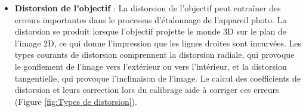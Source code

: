   \begin{itemize}
  	\item \textbf{Distorsion de l’objectif } :  La distorsion de l’objectif peut entraîner des erreurs importantes dans le processus d’étalonnage de l’appareil photo. La distorsion se produit lorsque l’objectif projette le monde 3D sur le plan de l’image 2D, ce qui donne l’impression que les lignes droites sont incurvées. Les types courants de distorsion comprennent la distorsion radiale, qui provoque le gonflement de l’image vers l’extérieur ou vers l’intérieur, et la distorsion tangentielle, qui provoque l’inclinaison de l’image. Le calcul des coefficients de distorsion et leurs correction lors du calibrage aide à corriger ces erreurs  (Figure \ref{fig:Types de distorsion}). 
  	
  	\begin{figure}[h]
  		\centering
\end{figure}
\end{itemize}
